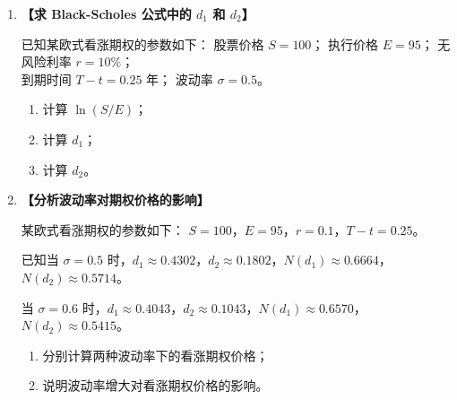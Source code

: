 \documentclass{article}
\begin{document}
\begin{enumerate}[label=\textbf{\arabic*.}]
沿用题目 7 的数据：\(S = 50\) 元，\(E = 45\) 元，\(r = 6\%\)，\(T - t = 0.25\) 年，\(\sigma = 0.2\)。

由 Black-Scholes 公式，欧式看跌期权价格为：
\(
P(S, t) = Ee^{-r(T-t)} N(-d_2) - SN(-d_1). 
\)

已知 \(N(-d_1) = 1 - N(d_1)\)，\(N(-d_2) = 1 - N(d_2)\)，且 \(N(d_1) \approx 0.7422\)，\(N(d_2) \approx 0.6651\)。

\begin{enumerate}[label=(\arabic*)]
    \item 计算 \(N(-d_1)\) 和 \(N(-d_2)\)；
    \item 计算看跌期权价格 \(P\)；
    \item 用平价公式验证：\(P = C - S + Ee^{-r(T-t)}\)。
\end{enumerate}



\item  {\bf{【求 Black-Scholes 公式中的 \(d_1\) 和 \(d_2\)】}} %

已知某欧式看涨期权的参数如下：
股票价格 \(S = 100\)；
执行价格 \(E = 95\)；
无风险利率 \(r = 10\%\)；\\ 
到期时间 \(T - t = 0.25\) 年；
波动率 \(\sigma = 0.5\)。

\begin{enumerate}[label=(\arabic*)]
    \item 计算 \(\ln(S/E)\)；
    \item 计算 \(d_1\)；
    \item 计算 \(d_2\)。
\end{enumerate}



\item  {\bf{【分析波动率对期权价格的影响】}} %

某欧式看涨期权的参数如下：
\(S = 100\)，\(E = 95\)，\(r = 0.1\)，\(T - t = 0.25\)。

已知当 \(\sigma = 0.5\) 时，\(d_1 \approx 0.4302\)，\(d_2 \approx 0.1802\)，\(N(d_1) \approx 0.6664\)，\(N(d_2) \approx 0.5714\)。

当 \(\sigma = 0.6\) 时，\(d_1 \approx 0.4043\)，\(d_2 \approx 0.1043\)，\(N(d_1) \approx 0.6570\)，\(N(d_2) \approx 0.5415\)。

\begin{enumerate}[label=(\arabic*)]
    \item 分别计算两种波动率下的看涨期权价格；
    \item 说明波动率增大对看涨期权价格的影响。
\end{enumerate}



\end{enumerate}
\end{document}
